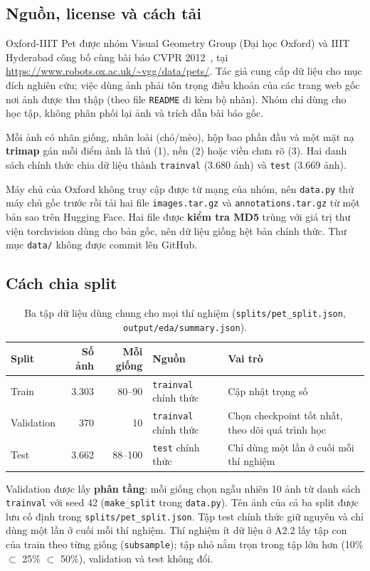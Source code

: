 \documentclass[12pt]{article}
\newcommand{\code}[1]{\texttt{#1}}
\newcommand{\st}[1]{\textbf{#1}}
\begin{document}
\subsection{Nguồn, license và cách tải}
Oxford-IIIT Pet được nhóm Visual Geometry Group (Đại học Oxford) và IIIT Hyderabad công bố cùng bài báo CVPR
2012~\cite{parkhi2012}, tại \url{https://www.robots.ox.ac.uk/~vgg/data/pets/}. Tác giả cung cấp dữ liệu
cho mục đích nghiên cứu; việc dùng ảnh phải tôn trọng điều khoản của các trang web gốc nơi ảnh được thu thập (theo file
\code{README} đi kèm bộ nhãn). Nhóm chỉ dùng cho học tập, không phân phối lại ảnh và trích dẫn bài báo gốc.

Mỗi ảnh có nhãn giống, nhãn loài (chó/mèo), hộp bao phần đầu và một mặt nạ \st{trimap} gán mỗi điểm ảnh là thú (1), nền (2)
hoặc viền chưa rõ (3). Hai danh sách chính thức chia dữ liệu thành \code{trainval} (3.680 ảnh) và \code{test} (3.669 ảnh).

Máy chủ của Oxford không truy cập được từ mạng của nhóm, nên \code{data.py} thử máy chủ gốc trước rồi tải hai file
\code{images.tar.gz} và \code{annotations.tar.gz} từ một bản sao trên Hugging Face. Hai file được \st{kiểm tra MD5} trùng
với giá trị thư viện torchvision dùng cho bản gốc, nên dữ liệu giống hệt bản chính thức. Thư mục \code{data/} không được
commit lên GitHub.

\subsection{Cách chia split}
\begin{table}[H]
\centering
\caption{Ba tập dữ liệu dùng chung cho mọi thí nghiệm (\code{splits/pet\_split.json}, \code{output/eda/summary.json}).}\label{tab:split}
\begin{tabularx}{\linewidth}{@{}lrrlL@{}}
\toprule
Split & Số ảnh & Mỗi giống & Nguồn & Vai trò \\\midrule
Train      & 3.303 & 80--90 & \code{trainval} chính thức & Cập nhật trọng số \\
Validation &   370 & 10     & \code{trainval} chính thức & Chọn checkpoint tốt nhất, theo dõi quá trình học \\
Test       & 3.662 & 88--100 & \code{test} chính thức    & Chỉ dùng một lần ở cuối mỗi thí nghiệm \\
\bottomrule
\end{tabularx}
\end{table}

Validation được lấy \st{phân tầng}: mỗi giống chọn ngẫu nhiên 10 ảnh từ danh sách \code{trainval} với seed 42
(\code{make\_split} trong \code{data.py}). Tên ảnh của cả ba split được lưu cố định trong \code{splits/pet\_split.json}.
Tập test chính thức giữ nguyên và chỉ dùng một lần ở cuối mỗi thí nghiệm. Thí nghiệm ít dữ liệu ở A2.2 lấy tập con của
train theo từng giống (\code{subsample}); tập nhỏ nằm trọn trong tập lớn hơn (10\% $\subset$ 25\% $\subset$ 50\%), validation
và test không đổi.
\end{document}
